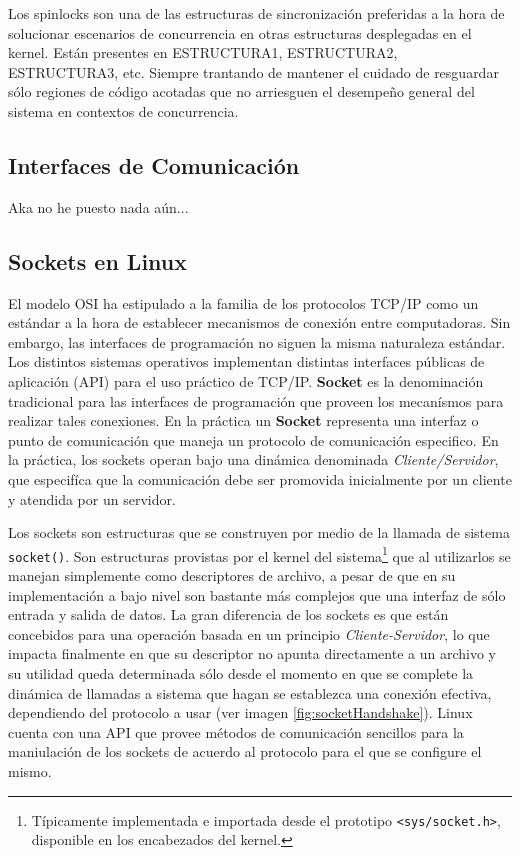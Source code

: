 Los spinlocks son una de las estructuras de sincronización preferidas a la hora de solucionar escenarios de concurrencia en otras estructuras desplegadas en el kernel. Están presentes en ESTRUCTURA1, ESTRUCTURA2, ESTRUCTURA3, etc. Siempre trantando de mantener el cuidado de resguardar sólo regiones de código acotadas que no arriesguen el desempeño general del sistema en contextos de concurrencia.

\subsection{Interfaces de Comunicación}

Aka no he puesto nada aún...

\subsection{Sockets en Linux}
El modelo OSI ha estipulado a la familia de los protocolos TCP/IP como un estándar a la hora de establecer mecanismos de conexión entre computadoras. Sin embargo, las interfaces de programación no siguen la misma naturaleza estándar. Los distintos sistemas operativos implementan distintas interfaces públicas de aplicación (API) para el uso práctico de TCP/IP. \textbf{Socket} es la denominación tradicional para las interfaces de programación que proveen los mecanísmos para realizar tales conexiones. En la práctica un \textbf{Socket} representa una interfaz o punto de comunicación que maneja un protocolo de comunicación especifico. En la práctica, los sockets operan bajo una dinámica denominada \emph{Cliente/Servidor}, que especifíca que la comunicación debe ser promovida inicialmente por un cliente y atendida por un servidor.

Los sockets son estructuras que se construyen por medio de la llamada de sistema \verb=socket()=. Son estructuras provistas por el kernel del sistema\footnote{Típicamente implementada e importada desde el prototipo \verb=<sys/socket.h>=, disponible en los encabezados del kernel.} que al utilizarlos se manejan simplemente como descriptores de archivo, a pesar de que en su implementación a bajo nivel son bastante más complejos que una interfaz de sólo entrada y salida de datos. La gran diferencia de los sockets es que están concebidos para una operación basada en un principio \emph{Cliente-Servidor}, lo que impacta finalmente en que su descriptor no apunta directamente a un archivo y su utilidad queda determinada sólo desde el momento en que se complete la dinámica de llamadas a sistema que hagan se establezca una conexión efectiva, dependiendo del protocolo a usar (ver imagen \ref{fig:socketHandshake}). Linux cuenta con una API que provee métodos de comunicación sencillos para la maniulación de los sockets de acuerdo al protocolo para el que se configure el mismo.

